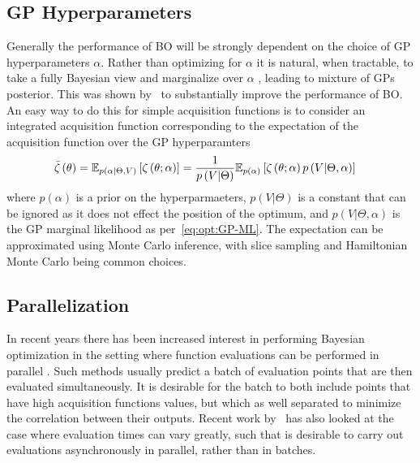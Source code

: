 \subsection{GP Hyperparameters}
\label{sec:opt:BO:hyp}

Generally the performance of BO will be strongly dependent on the choice of GP
 hyperparameters $\alpha$.  Rather than optimizing for $\alpha$ it is natural, 
 when tractable, to take a fully Bayesian view and marginalize
 over $\alpha$ \citep{osborne2009gaussian}, leading to
 mixture of GPs posterior.  This was shown
 by~\cite{snoek2012practical} to substantially improve the performance of BO.
 An easy way to do this for simple acquisition functions is to consider an
 integrated acquisition function corresponding to the expectation of the acquisition
 function over the GP hyperparamters~\citep{snoek2012practical}
\begin{align}
\label{eq:opt:intAcq}
\bar{\zeta}\left(\theta \right) &= \mathbb{E}_{p\left(\alpha | \Theta, V\right)}
\left[  \zeta\left(\theta  ; \alpha\right)  \right] = \frac{1}{p\left(V | \Theta \right)} \mathbb{E}_{p\left(\alpha \right)}
\left[  \zeta\left(\theta  ; \alpha\right)  p\left(V | \Theta, \alpha\right)\right]
\end{align}
where $p(\alpha)$ is a prior on the hyperparmaeters, $p\left(V | \Theta \right)$ is
a constant that can be ignored as it does not effect the position of the optimum, and
$p\left(V | \Theta, \alpha\right)$ is the GP marginal likelihood as per~\eqref{eq:opt:GP-ML}.
The expectation can be approximated using Monte Carlo inference, with slice sampling
\citep{murray2010slice} and Hamiltonian Monte Carlo \citep{hensman2015mcmc}
being common choices.

\subsection{Parallelization}
\label{sec:opt:BO:parallel}

In recent years there has been increased interest in performing Bayesian optimization in the setting
where function evaluations can be performed in parallel
\citep{contal2013parallel,desautels2014parallelizing,gonzalez2016batch,kathuria2016batched}. 
Such methods usually predict a batch of
evaluation points that are then evaluated simultaneously.
It is desirable for the batch to both include points that have high acquisition functions values, but
which as well separated to minimize the correlation between their outputs.  Recent work by~\cite{kandasamy2017asynchronous}
has also looked at the case where evaluation times can vary greatly, such that is desirable to
carry out evaluations asynchronously in parallel, rather than in batches.

